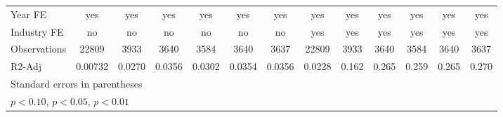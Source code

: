 {\begin{tabular}{l*{12}{c}}
\hline
Year FE             &         yes         &         yes         &         yes         &         yes         &         yes         &         yes         &         yes         &         yes         &         yes         &         yes         &         yes         &         yes         \\
Industry FE         &          no         &          no         &          no         &          no         &          no         &          no         &         yes         &         yes         &         yes         &         yes         &         yes         &         yes         \\
Observations        &       22809         &        3933         &        3640         &        3584         &        3640         &        3637         &       22809         &        3933         &        3640         &        3584         &        3640         &        3637         \\
R2-Adj              &     0.00732         &      0.0270         &      0.0356         &      0.0302         &      0.0354         &      0.0356         &      0.0228         &       0.162         &       0.265         &       0.259         &       0.265         &       0.270         \\
\hline\hline
\multicolumn{13}{l}{\footnotesize Standard errors in parentheses}\\
\multicolumn{13}{l}{\footnotesize \sym{*} \(p<0.10\), \sym{**} \(p<0.05\), \sym{***} \(p<0.01\)}\\
\end{tabular}
}
